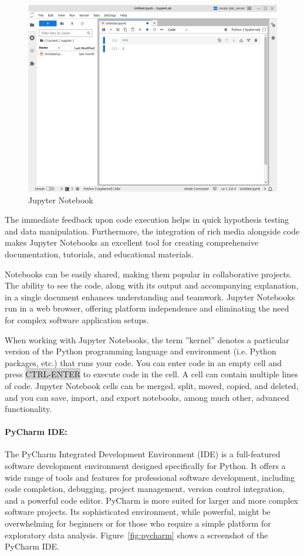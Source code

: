 \begin{figure}
\centering
\includegraphics[width=.75\textwidth]{screen2.png}
\caption{Jupyter Notebook}
\label{fig:jupyter}
\end{figure}

The immediate feedback upon code execution helps in quick hypothesis testing and data manipulation. Furthermore, the integration of rich media alongside code makes Jupyter Notebooks an excellent tool for creating comprehensive documentation, tutorials, and educational materials.

Notebooks can be easily shared, making them popular in collaborative projects. The ability to see the code, along with its output and accompanying explanation, in a single document enhances understanding and teamwork. Jupyter Notebooks run in a web browser, offering platform independence and eliminating the need for complex software application setups.

When working with Jupyter Notebooks, the term ''kernel'' denotes a particular version of the Python programming language and environment (i.e. Python packages, etc.) that runs your code. You can enter code in an empty cell and press \colorbox{lightgray}{CTRL-ENTER} to execute code in the cell. A cell can contain multiple lines of code. Jupyter Notebook cells can be merged, split, moved, copied, and deleted, and you can save, import, and export notebooks, among much other, advanced functionality.

\paragraph{PyCharm IDE:} The PyCharm Integrated Development Environment (IDE) is a full-featured software development environment designed specifically for Python. It offers a wide range of tools and features for professional software development, including code completion, debugging, project management, version control integration, and a powerful code editor. PyCharm is more suited for larger and more complex software projects. Its sophisticated environment, while powerful, might be overwhelming for beginners or for those who require a simple platform for exploratory data analysis. Figure~\ref{fig:pycharm} shows a screenshot of the PyCharm IDE.


